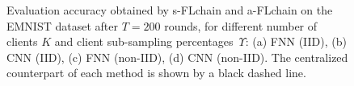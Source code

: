 \documentclass[lettersize,journal]{IEEEtran}
\begin{document}
\begin{figure}[ht!]
	\centering
	\caption{Evaluation accuracy obtained by s-FLchain and a-FLchain on the EMNIST dataset after $T=200$ rounds, for different number of clients $K$ and client sub-sampling percentages~$\Upsilon$: (a) FNN (IID), (b) CNN (IID), (c) FNN (non-IID), (d) CNN (non-IID). The centralized counterpart of each method is shown by a black dashed line.}
	\label{fig:temporal_evolution}
\end{figure}
\end{document}
